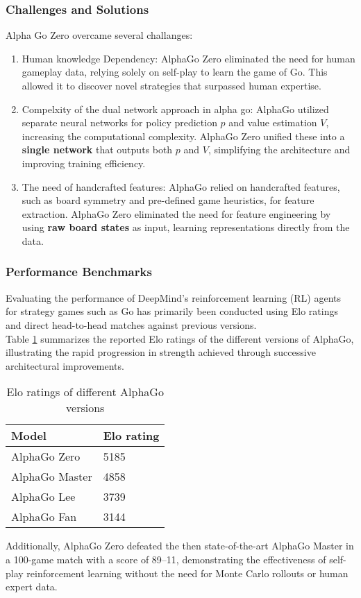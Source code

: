 \subsubsection{Challenges and Solutions}
Alpha Go Zero overcame several challanges:
\begin{enumerate}
    \item Human knowledge Dependency: AlphaGo Zero eliminated the need for human gameplay
          data, relying solely on self-play to learn the game of Go. This allowed it to
          discover novel strategies that surpassed human expertise.
    \item Compelxity of the dual network approach in alpha go: AlphaGo utilized separate
          neural networks for policy prediction $p$ and value estimation $V$, increasing
          the computational complexity. AlphaGo Zero unified these into a \textbf{single
              network} that outputs both $p$ and $V$, simplifying the architecture and
          improving training efficiency.
    \item The need of handcrafted features: AlphaGo relied on handcrafted features, such
          as board symmetry and pre-defined game heuristics, for feature extraction.
          AlphaGo Zero eliminated the need for feature engineering by using \textbf{raw
              board states} as input, learning representations directly from the data.
\end{enumerate}

\subsubsection{Performance Benchmarks}

Evaluating the performance of DeepMind’s reinforcement learning (RL) agents for strategy games such as Go has primarily been conducted using Elo ratings and direct head-to-head matches against previous versions. \\

Table \ref{tab:elo_ratings} summarizes the reported Elo ratings of the different versions of AlphaGo, illustrating the rapid progression in strength achieved through successive architectural improvements.

\begin{table}[ht]
\caption{Elo ratings of different AlphaGo versions}
\label{tab:elo_ratings}
\centering
\begin{tabular}{|l|l|}
\hline
Model          & Elo rating \\ \hline
AlphaGo Zero   & 5185       \\ \hline
AlphaGo Master & 4858       \\ \hline
AlphaGo Lee    & 3739       \\ \hline
AlphaGo Fan    & 3144       \\ \hline
\end{tabular}
\end{table}

Additionally, AlphaGo Zero defeated the then state-of-the-art AlphaGo Master in a 100-game match with a score of 89–11, demonstrating the effectiveness of self-play reinforcement learning without the need for Monte Carlo rollouts or human expert data.
